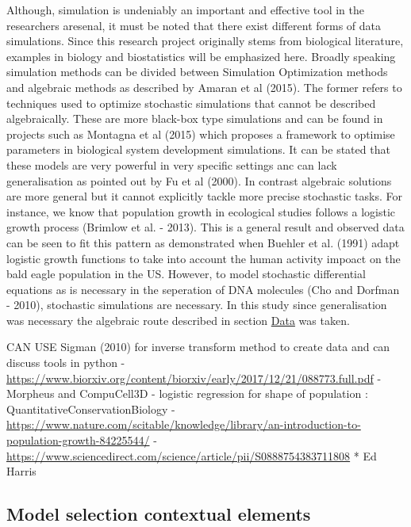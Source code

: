 \documentclass[]{article}
\begin{document}
Although, simulation is undeniably an important and effective tool in
the researchers aresenal, it must be noted that there exist different
forms of data simulations. Since this research project originally stems
from biological literature, examples in biology and biostatistics will
be emphasized here. Broadly speaking simulation methods can be divided
between Simulation Optimization methods and algebraic methods as
described by Amaran et al (2015). The former refers to techniques used
to optimize stochastic simulations that cannot be described
algebraically. These are more black-box type simulations and can be
found in projects such as Montagna et al (2015) which proposes a
framework to optimise parameters in biological system development
simulations. It can be stated that these models are very powerful in
very specific settings anc can lack generalisation as pointed out by Fu
et al (2000). In contrast algebraic solutions are more general but it
cannot explicitly tackle more precise stochastic tasks. For instance, we
know that population growth in ecological studies follows a logistic
growth process (Brimlow et al. - 2013). This is a general result and
observed data can be seen to fit this pattern as demonstrated when
Buehler et al. (1991) adapt logistic growth functions to take into
account the human activity impoact on the bald eagle population in the
US. However, to model stochastic differential equations as is necessary
in the seperation of DNA molecules (Cho and Dorfman - 2010), stochastic
simulations are necessary. In this study since generalisation was
necessary the algebraic route described in section
\protect\hyperlink{data}{Data} was taken.

CAN USE Sigman (2010) for inverse transform method to create data and
can discuss tools in python -
\url{https://www.biorxiv.org/content/biorxiv/early/2017/12/21/088773.full.pdf}
- Morpheus and CompuCell3D - logistic regression for shape of population
: QuantitativeConservationBiology -
\url{https://www.nature.com/scitable/knowledge/library/an-introduction-to-population-growth-84225544/}
-
\url{https://www.sciencedirect.com/science/article/pii/S0888754383711808}
* Ed Harris

\hypertarget{model-selection-contextual-elements}{%
\subsection{Model selection contextual
elements}\label{model-selection-contextual-elements}}
\end{document}

